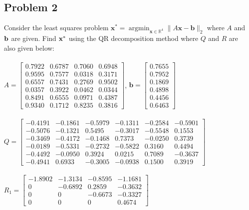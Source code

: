 \documentclass[12pt]{article}
\newcommand{\bfx}{{\bf x}}
\newcommand{\bfb}{{\bf b}}
\begin{document}
\subsection*{Problem 2} Consider the least squares problem $\mathbf{x}^{*}=\operatorname{argmin}_{\mathbf{x} \in \mathbb{R}^{4}}\|A \mathbf{x}-\mathbf{b}\|_{2}$ where $A$ and $\bfb$ are given. Find $\bfx^{*}$ using the QR decomposition method where $Q$ and $R$ are also given below:
\\~\\$A=\left[\begin{array}{cccc}{0.7922} & {0.6787} & {0.7060} & {0.6948} \\ {0.9595} & {0.7577} & {0.0318} & {0.3171} \\ {0.6557} & {0.7431} & {0.2769} & {0.9502} \\ {0.0357} & {0.3922} & {0.0462} & {0.0344} \\ {0.8491} & {0.6555} & {0.0971} & {0.4387} \\ {0.9340} & {0.1712} & {0.8235} & {0.3816}\end{array}\right]$, $\mathbf{b}=\left[\begin{array}{l}{0.7655} \\ {0.7952} \\ {0.1869} \\ {0.4898} \\ {0.4456} \\ {0.6463}\end{array}\right]$
\\~\\$Q=\left[\begin{array}{cccccc}{-0.4191} & {-0.1861} & {-0.5979} & {-0.1311} & {-0.2584} & {-0.5901} \\ {-0.5076} & {-0.1321} & {0.5495} & {-0.3017} & {-0.5548} & {0.1553} \\ {-0.3469} & {-0.4172} & {-0.1468} & {0.7373} & {-0.0250} & {0.3739} \\ {-0.0189} & {-0.5331} & {-0.2732} & {-0.5822} & {0.3160} & {0.4494} \\ {-0.4492} & {-0.0950} & {0.3924} & {0.0215} & {0.7089} & {-0.3637} \\ {-0.4941} & {0.6933} & {-0.3005} & {-0.0938} & {0.1500} & {0.3919}\end{array}\right]$
\\~\\$R_{1}=\left[\begin{array}{rrrr}{-1.8902} & {-1.3134} & {-0.8595} & {-1.1681} \\ {0} & {-0.6892} & {0.2859} & {-0.3632} \\ {0} & {0} & {-0.6673} & {-0.3327} \\ {0} & {0} & {0} & {0.4674}\end{array}\right]$
\end{document}
